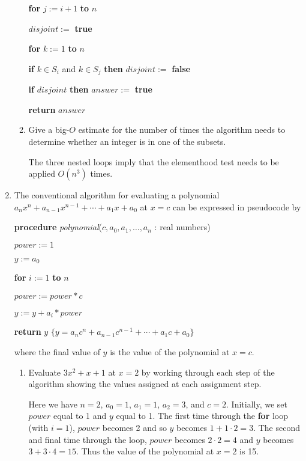 \documentclass[11pt]{article}
\begin{document}
\begin{enumerate}[label=\textbf{\arabic*.}]
\begin{enumerate}[label=\textbf{\alph*)}]
		\qquad \textbf{for} $j := i + 1$ \textbf{to} $n$
		
		\qquad\qquad $disjoint :=$ \textbf{true}
		
		\qquad\qquad \textbf{for} $k := 1$ \textbf{to} $n$
		
		\qquad\qquad\qquad \textbf{if} $k \in S_i$ and $k \in S_j$ \textbf{then} $disjoint :=$ \textbf{false}
		
		\qquad\qquad \textbf{if} $disjoint$ \textbf{then} $answer :=$ \textbf{true}
		
		\textbf{return} $answer$
		
		\item Give a big-$O$ estimate for the number of times the algorithm needs to determine whether an integer is in one of the subsets.
		
		The three nested loops imply that the elementhood test needs to be applied $O(n^3)$ times.
	\end{enumerate}

	\item The conventional algorithm for evaluating a polynomial $a_nx^n + a_{n - 1}x^{n - 1} + \cdots + a_1x + a_0$ at $x = c$ can be expressed in pseudocode by
	
	\textbf{procedure} \emph{polynomial}($c, a_0, a_1, \ldots, a_n$ : real numbers)
	
	$power := 1$
	
	$y := a_0$
	
	\textbf{for} $i := 1$ \textbf{to} $n$
	
	\qquad $power := power * c$
	
	\qquad $y := y + a_i * power$
	
	\textbf{return} $y$ $\{ y = a_nc^n + a_{n - 1}c^{n - 1} + \cdots + a_1c + a_0 \}$
	
	where the final value of $y$ is the value of the polynomial at $x = c$.
	
	\begin{enumerate}[label=\textbf{\alph*)}]
		\item Evaluate $3x^2 + x + 1$ at $x = 2$ by working through each step of the algorithm showing the values assigned at each assignment step.
		
		Here we have $n = 2$, $a_0 = 1$, $a_1 = 1$, $a_2 = 3$, and $c = 2$. Initially, we set $power$ equal to 1 and $y$ equal to 1. The first time through the \textbf{for} loop (with $i = 1$), $power$ becomes 2 and so $y$ becomes $1 + 1 \cdot 2 = 3$. The second and final time through the loop, $power$ becomes $2 \cdot 2 = 4$ and $y$ becomes $3 + 3 \cdot 4 = 15$. Thus the value of the polynomial at $x = 2$ is 15.
		

\end{enumerate}
\end{enumerate}
\end{document}

